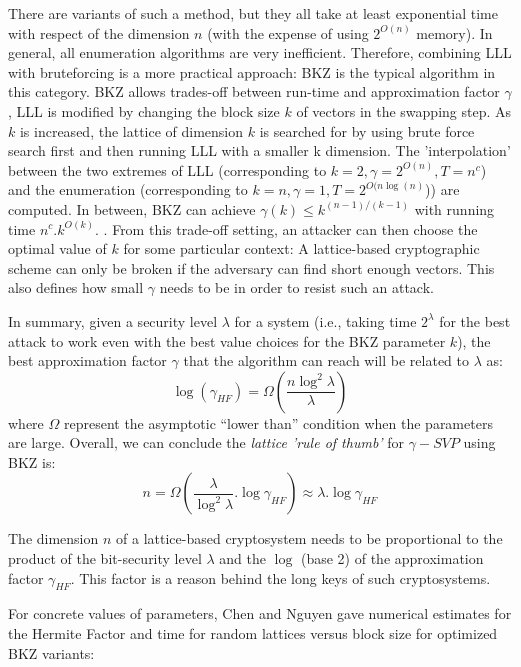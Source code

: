 There are variants of such a method, but they all take at least
exponential time with respect of the dimension $n$ (with the expense of using $2^{O(n)}$
memory). In general, all enumeration algorithms are very inefficient. Therefore,
combining LLL with bruteforcing is a more practical approach: BKZ is the typical
algorithm in this category.  BKZ allows trades-off between run-time and
approximation factor $\gamma$, LLL is modified by changing the block size $k$ of
vectors in the swapping step. As $k$ is increased, the lattice of
dimension $k$ is searched for by using brute force search first and then running LLL with a smaller k dimension. The 'interpolation' between the two extremes of LLL (corresponding to
$k = 2, \gamma = 2^{O(n)}, T = n^c$) and the enumeration (corresponding to
$k = n, \gamma=1, T = 2^{O(n\log(n)}$)) are computed. In between, BKZ can achieve
$\gamma(k) \leq k^{(n-1)/(k-1)}$ with running time
$n^c.k^{O(k)}$. \cite{hanrot2011terminating}. From this trade-off setting, an
attacker can then choose the optimal value of $k$ for some particular context: A
lattice-based cryptographic scheme can only be broken if the adversary can find
short enough vectors. This also defines how small $\gamma$ needs to be in order
to resist such an attack.

In summary, given a security level $\lambda$ for a system (i.e., taking
time $2^\lambda$ for the best attack to work even with the best value choices for the BKZ
parameter $k$), the best approximation factor $\gamma$ that the
algorithm can reach will be related to $\lambda$ as:
\[
  \log(\gamma_{HF}) = \Omega(\frac{n\log^2\lambda}{\lambda})
\]
where $\Omega$ represent the asymptotic ``lower than'' condition when the parameters
are large. Overall, we can conclude the \emph{lattice 'rule of thumb'} for
$\gamma-SVP$ using BKZ is:
\[
  n = \Omega(\frac{\lambda}{\log^2\lambda}.\log\gamma_{HF}) \approx \lambda
  . \log\gamma_{HF}
\]

\begin{remark}
  The dimension $n$ of a lattice-based cryptosystem needs to be proportional to
  the product of the bit-security level $\lambda$ and the $\log$ (base 2) of the
  approximation factor $\gamma_{HF}$.  This factor is a reason behind the long
  keys of such cryptosystems.
  \label{rem:dimension}
\end{remark}

For concrete values of parameters, Chen and Nguyen \cite{chen2011bkz} gave
numerical estimates for the Hermite Factor and time for random lattices versus block
size for optimized BKZ variants:

